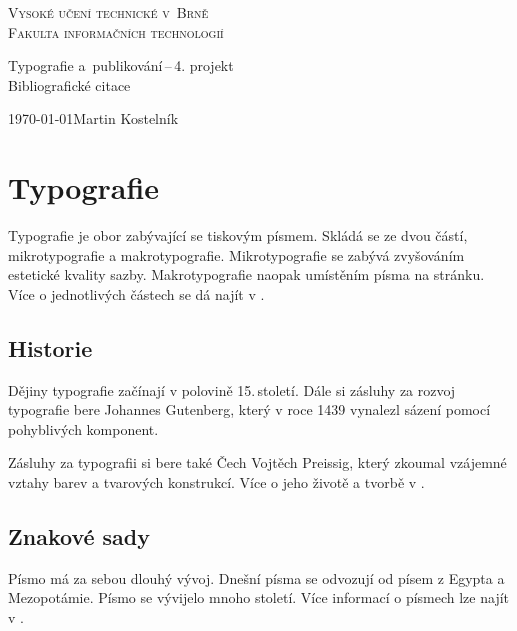 \documentclass[a4paper,11pt]{article}
\begin{document}
	\begin{titlepage}
		\begin{center}
			\textsc{\Huge Vysoké učení technické v~Brně\\
				\vspace{0.4em}\huge Fakulta informačních technologií}
			
			
			{\LARGE Typografie a~publikování\,--\,4. projekt\\
				\Huge Bibliografické citace\\ \vspace{0.3em}}
			
			
			{\Large \today \hfill Martin Kostelník}
		\end{center}
	\end{titlepage}

	\section{Typografie}
		Typografie je obor zabývající se tiskovým písmem. Skládá se ze dvou částí, mikrotypografie a makrotypografie. Mikrotypografie se zabývá zvyšováním estetické kvality sazby. Makrotypografie naopak umístěním písma na stránku. Více o jednotlivých částech se dá najít v \cite{macromicro}.
		
		\subsection{Historie}
			Dějiny typografie začínají v polovině 15.\,století. Dále si zásluhy za rozvoj typografie bere Johannes Gutenberg, který v roce 1439 vynalezl sázení pomocí pohyblivých komponent. \cite{gutten}
			
			\vspace{10pt}
			
			Zásluhy za typografii si bere také Čech Vojtěch Preissig, který zkoumal vzájemné vztahy barev a tvarových konstrukcí. Více o jeho životě a tvorbě v \cite{Hoskova2013}.
			
		\subsection{Znakové sady}
			Písmo má za sebou dlouhý vývoj. Dnešní písma se odvozují od písem z Egypta a Mezopotámie. Písmo se vývijelo mnoho století. Více informací o písmech lze najít v \cite{Cerny1999}.
			
\end{document}
